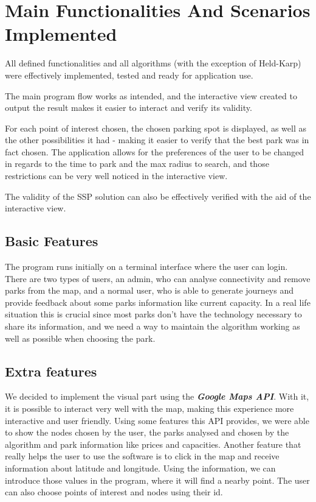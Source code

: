\documentclass[a4paper, 12pt]{report}
\begin{document}
    \chapter{Main Functionalities And Scenarios Implemented} %
    
    All defined functionalities and all algorithms (with the exception of Held-Karp) were effectively implemented, tested and ready for application use.
    
    The main program flow works as intended, and the interactive view created to output the result makes it easier to interact and verify its validity.
    
    For each point of interest chosen, the chosen parking spot is displayed, as well as the other possibilities it had - making it easier to verify that the best park was in fact chosen. The application allows for the preferences of the user to be changed in regards to the time to park and the max radius to search, and those restrictions can be very well noticed in the interactive view.
    
    The validity of the SSP solution can also be effectively verified with the aid of the interactive view.
    
   \section{Basic Features}
    
    The program runs initially on a terminal interface where the user can login. There are two types of users, an admin, who can analyse connectivity and remove parks from the map, and a normal user, who is able to generate journeys and provide feedback about some parks information like current capacity. In a real life situation this is crucial since most parks don't have the technology necessary to share its information, and we need a way to maintain the algorithm working as well as possible when choosing the park. 
    
    \section{Extra features}
    
    We decided to implement the visual part using the \textbf{\textit{Google Maps API}}. With it, it is possible to interact very well with the map, making this experience more interactive and user friendly. Using some features this API provides, we were able to show the nodes chosen by the user, the parks analysed and chosen by the algorithm and park information like prices and capacities. Another feature that really helps the user to use the software is to click in the map and receive information about latitude and longitude. Using the information, we can introduce those values in the program, where it will find a nearby point. The user can also choose points of interest and nodes using their id.
    
\end{document}
